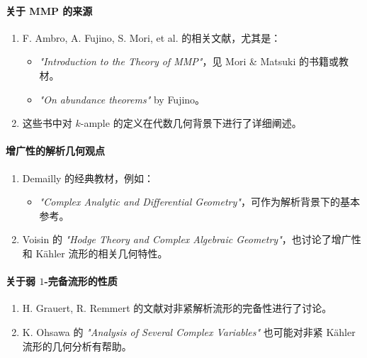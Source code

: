 \documentclass[lang=cn,zihao=-4,a4paper,fontset=none]{beautybook}
\begin{document}
\begin{solution}
\paragraph*{关于 MMP 的来源}
\begin{enumerate}[label=\arabic*.]
    \item F. Ambro, A. Fujino, S. Mori, et al. 的相关文献，尤其是：
    \begin{itemize}
        \item \textit{"Introduction to the Theory of MMP"}，见 Mori \& Matsuki 的书籍或教材。
        \item \textit{"On abundance theorems"} by Fujino。
    \end{itemize}
    \item 这些书中对 $k$-ample 的定义在代数几何背景下进行了详细阐述。
\end{enumerate}
\paragraph*{增广性的解析几何观点}
\begin{enumerate}[label=\arabic*.]
    \item Demailly 的经典教材，例如：
    \begin{itemize}
        \item \textit{"Complex Analytic and Differential Geometry"}，可作为解析背景下的基本参考。
    \end{itemize}
    \item Voisin 的 \textit{"Hodge Theory and Complex Algebraic Geometry"}，也讨论了增广性和 Kähler 流形的相关几何特性。
\end{enumerate}
\paragraph*{关于弱 $1$-完备流形的性质}
\begin{enumerate}[label=\arabic*.]
    \item H. Grauert, R. Remmert 的文献对非紧解析流形的完备性进行了讨论。
    \item K. Ohsawa 的 \textit{"Analysis of Several Complex Variables"} 也可能对非紧 Kähler 流形的几何分析有帮助。
\end{enumerate}
\end{solution}

\end{document}
